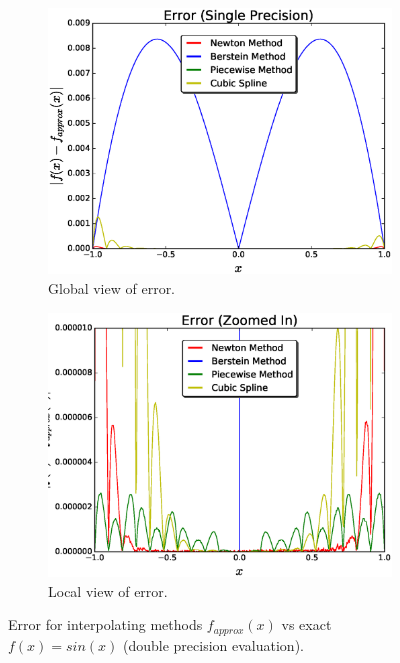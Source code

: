 \documentclass[12pt]{article}
\theoremstyle{remark}
\begin{document}
\begin{figure}[H]
	\centering
	\begin{subfigure}{.5\textwidth}
		\centering
		\includegraphics[width=1.1\linewidth]{errorFig4.eps}
		\caption{Global view of error.}
		\label{fig:sub1}
	\end{subfigure}%
	\begin{subfigure}{.5\textwidth}
		\centering
		\includegraphics[width=1.1\linewidth]{errorFigg4.eps}
		\caption{Local view of error.}
		\label{fig:sub2}
	\end{subfigure}
	\caption{Error for interpolating methods $f_{approx}(x)$ vs exact $f(x) = sin(x)$ (double precision evaluation). }
	\label{fig:test}
\end{figure}
\end{document}
